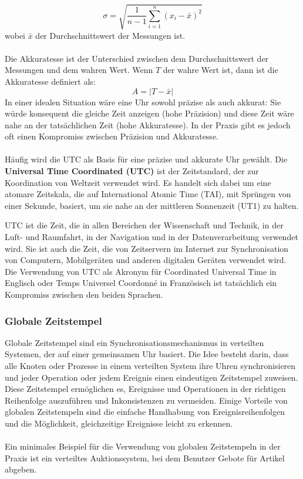 \documentclass[../vs-script-first-v01.tex]{subfiles}
\begin{document}
\begin{equation}
\sigma = \sqrt{\frac{1}{n-1} \sum_{i=1}^{n} (x_i - \bar{x})^2}
\end{equation}
wobei $\bar{x}$ der Durchschnittswert der Messungen ist.
\\\\
Die Akkuratesse ist der Unterschied zwischen dem Durchschnittswert der Messungen und dem wahren Wert. Wenn $T$ der wahre Wert ist, dann ist die Akkuratesse definiert als:
\begin{equation}
A = |T - \bar{x}|
\end{equation}
In einer idealen Situation wäre eine Uhr sowohl präzise als auch akkurat: Sie würde konsequent die gleiche Zeit anzeigen (hohe Präzision) und diese Zeit wäre nahe an der tatsächlichen Zeit (hohe Akkuratesse). In der Praxis gibt es jedoch oft einen Kompromiss zwischen Präzision und Akkuratesse.
\\\\
Häufig wird die UTC als Basis für eine präzise und akkurate Uhr gewählt.
Die \textbf{Universal Time Coordinated (UTC)} ist der Zeitstandard, der zur Koordination von Weltzeit verwendet wird. Es handelt sich dabei um eine atomare Zeitskala, die auf International Atomic Time (TAI), mit Sprüngen von einer Sekunde, basiert, um sie nahe an der mittleren Sonnenzeit (UT1) zu halten.

UTC ist die Zeit, die in allen Bereichen der Wissenschaft und Technik, in der Luft- und Raumfahrt, in der Navigation und in der Datenverarbeitung verwendet wird. Sie ist auch die Zeit, die von Zeitservern im Internet zur Synchronisation von Computern, Mobilgeräten und anderen digitalen Geräten verwendet wird.
Die Verwendung von UTC als Akronym für Coordinated Universal Time in Englisch oder Temps Universel Coordonné in Französisch ist tatsächlich ein Kompromiss zwischen den beiden Sprachen.


\subsubsection{Globale Zeitstempel}
Globale Zeitstempel sind ein Synchronisationsmechanismus in verteilten Systemen, der auf einer gemeinsamen Uhr basiert. Die Idee besteht darin, dass alle Knoten oder Prozesse in einem verteilten System ihre Uhren synchronisieren und jeder Operation oder jedem Ereignis einen eindeutigen Zeitstempel zuweisen. Diese Zeitstempel ermöglichen es, Ereignisse und Operationen in der richtigen Reihenfolge auszuführen und Inkonsistenzen zu vermeiden. Einige Vorteile von globalen Zeitstempeln sind die einfache Handhabung von Ereignisreihenfolgen und die Möglichkeit, gleichzeitige Ereignisse leicht zu erkennen.
\\\\
Ein minimales Beispiel für die Verwendung von globalen Zeitstempeln in der Praxis ist ein verteiltes Auktionssystem, bei dem Benutzer Gebote für Artikel abgeben.
\end{document}
